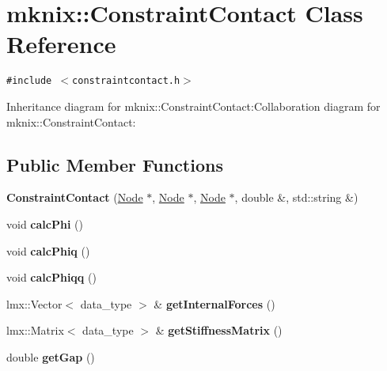 \hypertarget{classmknix_1_1ConstraintContact}{
\section{mknix::ConstraintContact Class Reference}
\label{classmknix_1_1ConstraintContact}
}
{\tt \#include $<$constraintcontact.h$>$}

Inheritance diagram for mknix::ConstraintContact:Collaboration diagram for mknix::ConstraintContact:\subsection*{Public Member Functions}
\begin{CompactItemize}
\item 
\hypertarget{classmknix_1_1ConstraintContact_bfcda7ac9dc63a790078f2fb26497a6e}{
\textbf{ConstraintContact} (\hyperlink{classmknix_1_1Node}{Node} $\ast$, \hyperlink{classmknix_1_1Node}{Node} $\ast$, \hyperlink{classmknix_1_1Node}{Node} $\ast$, double \&, std::string \&)}
\label{classmknix_1_1ConstraintContact_bfcda7ac9dc63a790078f2fb26497a6e}

\item 
\hypertarget{classmknix_1_1ConstraintContact_21a89037754ef5d968bda199ad3f1858}{
void \textbf{calcPhi} ()}
\label{classmknix_1_1ConstraintContact_21a89037754ef5d968bda199ad3f1858}

\item 
\hypertarget{classmknix_1_1ConstraintContact_88c495ea01a5f8f8807dd72ae3e7240f}{
void \textbf{calcPhiq} ()}
\label{classmknix_1_1ConstraintContact_88c495ea01a5f8f8807dd72ae3e7240f}

\item 
\hypertarget{classmknix_1_1ConstraintContact_d9b4db34bf76f2d8ea9532d5d3e0449f}{
void \textbf{calcPhiqq} ()}
\label{classmknix_1_1ConstraintContact_d9b4db34bf76f2d8ea9532d5d3e0449f}

\item 
\hypertarget{classmknix_1_1ConstraintContact_e4ebea11a39b4cf89ce317154abc99e3}{
lmx::Vector$<$ data\_\-type $>$ \& \textbf{getInternalForces} ()}
\label{classmknix_1_1ConstraintContact_e4ebea11a39b4cf89ce317154abc99e3}

\item 
\hypertarget{classmknix_1_1ConstraintContact_59a64aabefe8af49a7cd657fe70716de}{
lmx::Matrix$<$ data\_\-type $>$ \& \textbf{getStiffnessMatrix} ()}
\label{classmknix_1_1ConstraintContact_59a64aabefe8af49a7cd657fe70716de}

\item 
\hypertarget{classmknix_1_1ConstraintContact_4fcfe47c1421fd375ff806b8ef411f47}{
double \textbf{getGap} ()}
\label{classmknix_1_1ConstraintContact_4fcfe47c1421fd375ff806b8ef411f47}

\end{CompactItemize}
